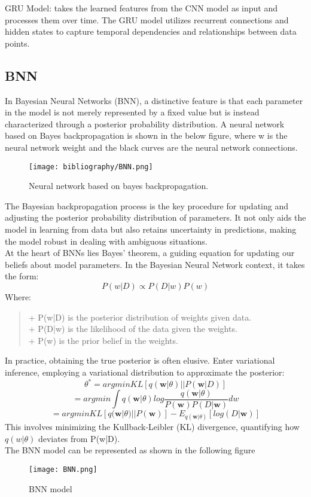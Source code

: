 \documentclass{ieeeojies}
\begin{document}
GRU Model: takes the learned features from the CNN model as input and processes them over time. The GRU model utilizes recurrent connections and hidden states to capture temporal dependencies and relationships between data points.

\subsection{BNN}
In Bayesian Neural Networks (BNN), a distinctive feature is that each parameter in the model is not merely represented by a fixed value but is instead characterized through a posterior probability distribution.
A neural network based on Bayes backpropagation is shown in the below figure, where w is the neural network weight and the black curves are the neural network connections.
\begin{figure}[H]
  \centering
  \begin{minipage}{1\linewidth}
    \centering
     \texttt{[image: bibliography/BNN.png]}
        \caption{Neural network based on bayes backpropagation.}
    \label{fig:3}
  \end{minipage}
\end{figure}
The Bayesian backpropagation process is the key procedure for updating and adjusting the posterior probability distribution of parameters. It not only aids the model in learning from data but also retains uncertainty in predictions, making the model robust in dealing with ambiguous situations.\\
At the heart of BNNs lies Bayes' theorem, a guiding equation for updating our beliefs about model parameters. In the Bayesian Neural Network context, it takes the form:
\[
P(w|D) \propto P(D|w)P(w)
\]
Where:
\begin{quote}
    + P(w|D) is the posterior distribution of weights given data.\\
    + P(D|w) is the likelihood of the data given the weights.\\
    + P(w) is the prior belief in the weights.\\
\end{quote}
In practice, obtaining the true posterior  is often elusive. Enter variational inference, employing a variational distribution  to approximate the posterior:
\[
\theta^*=argminKL[q({\boldsymbol{w}|\theta})||P(\boldsymbol{w}|D)]
\]
\[
       =argmin\int q(\boldsymbol{w}|\theta)log\frac{q(\boldsymbol{w}|\theta)}{P(\boldsymbol{w})P(D|\boldsymbol{w})}dw
\]
\[
       =argminKL[q(\boldsymbol{w}|\theta)||P(\boldsymbol{w})] - E_{q(\boldsymbol{w}|\theta)}[log(D|\boldsymbol{w})]
\]
This involves minimizing the Kullback-Leibler (KL) divergence, quantifying how $q({w|\theta})$ deviates from P(w|D). \\
The BNN model can be represented as shown in the following figure
\begin{figure}[H]
  \centering
  \begin{minipage}{1\linewidth}
    \centering
     \texttt{[image: BNN.png]}
        \caption{BNN model}
    \label{fig:3}
  \end{minipage}
\end{figure}
\end{document}
